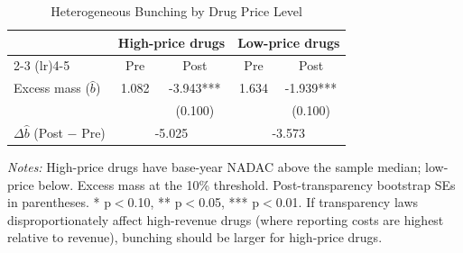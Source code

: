 \begin{table}[H]
\centering
\caption{Heterogeneous Bunching by Drug Price Level}
\begin{threeparttable}
\begin{tabular}{lcccc}
\toprule
& \multicolumn{2}{c}{High-price drugs} & \multicolumn{2}{c}{Low-price drugs} \\
\cmidrule(lr){2-3} \cmidrule(lr){4-5}
& Pre & Post & Pre & Post \\
\midrule
Excess mass ($\hat{b}$) & 1.082 & -3.943*** & 1.634 & -1.939*** \\
& & (0.100) & & (0.100) \\[0.5em]
$\Delta\hat{b}$ (Post $-$ Pre) & \multicolumn{2}{c}{-5.025} & \multicolumn{2}{c}{-3.573} \\
\bottomrule
\end{tabular}
\begin{tablenotes}[flushleft]
\small
\item \textit{Notes:} High-price drugs have base-year NADAC above the sample median; low-price below. Excess mass at the 10\% threshold. Post-transparency bootstrap SEs in parentheses. * p$<$0.10, ** p$<$0.05, *** p$<$0.01. If transparency laws disproportionately affect high-revenue drugs (where reporting costs are highest relative to revenue), bunching should be larger for high-price drugs.
\end{tablenotes}
\end{threeparttable}
\label{tab:heterogeneity}
\end{table}
